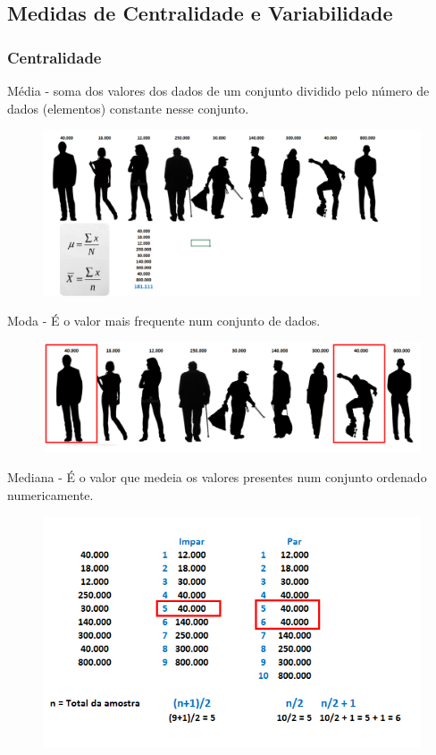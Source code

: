 \subsection{Medidas de Centralidade e Variabilidade} 

\subsubsection{Centralidade}

Média - soma dos valores dos dados de um conjunto dividido pelo número de dados (elementos) constante nesse conjunto.

	\begin{figure}[h!]
		\includegraphics[scale=0.50]{cap2/MedidasCentralidadeVariabilidade/Media.png}
	\end{figure}

Moda - É o valor mais frequente num conjunto de dados.

	\begin{figure}[h!]
	\includegraphics[scale=0.50]{cap2/MedidasCentralidadeVariabilidade/Moda.png}
	\end{figure}

\newpage

Mediana - É o valor que medeia os valores presentes num conjunto ordenado numericamente.

	\begin{figure}[h!]
	\includegraphics[scale=0.50]{cap2/MedidasCentralidadeVariabilidade/Mediana.png}
	\end{figure}


